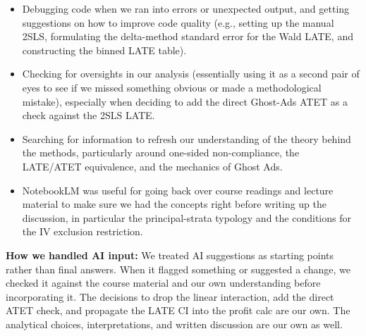 \documentclass[
  letterpaper,
  DIV=11,
  numbers=noendperiod]{scrartcl}
\providecommand{\tightlist}{%
  \setlength{\itemsep}{0pt}\setlength{\parskip}{0pt}}
\begin{document}
\begin{itemize}
\tightlist
\item
  Debugging code when we ran into errors or unexpected output, and
  getting suggestions on how to improve code quality (e.g., setting up
  the manual 2SLS, formulating the delta-method standard error for the
  Wald LATE, and constructing the binned LATE table).
\item
  Checking for oversights in our analysis (essentially using it as a
  second pair of eyes to see if we missed something obvious or made a
  methodological mistake), especially when deciding to add the direct
  Ghost-Ads ATET as a check against the 2SLS LATE.
\item
  Searching for information to refresh our understanding of the theory
  behind the methods, particularly around one-sided non-compliance, the
  LATE/ATET equivalence, and the mechanics of Ghost Ads.
\item
  NotebookLM was useful for going back over course readings and lecture
  material to make sure we had the concepts right before writing up the
  discussion, in particular the principal-strata typology and the
  conditions for the IV exclusion restriction.
\end{itemize}

\textbf{How we handled AI input:} We treated AI suggestions as starting
points rather than final answers. When it flagged something or suggested
a change, we checked it against the course material and our own
understanding before incorporating it. The decisions to drop the linear
interaction, add the direct ATET check, and propagate the LATE CI into
the profit calc are our own. The analytical choices, interpretations,
and written discussion are our own as well.
\end{document}
